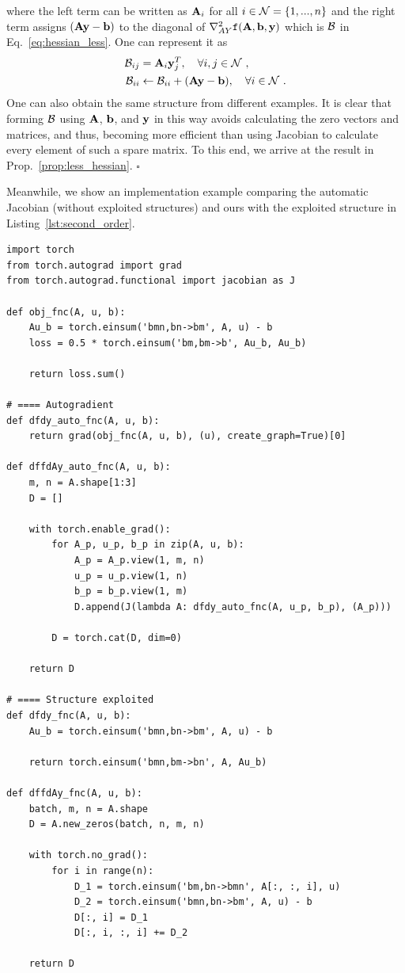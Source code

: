 where the left term can be written as $\mathbf{A}_i$ for all $i \in \mathcal{N} = \{1, ..., n\}$ and
the right term assigns $(\mathbf{A} \mathbf{y} - \mathbf{b})$ to the diagonal of $\nabla^2_{AY} \texttt{f}(\mathbf{A}, \mathbf{b}, \mathbf{y})$ which is $\mathcal{B}$ in Eq.~\eqref{eq:hessian_less}.
One can represent it as
\begin{align}
    \mathcal{B}_{ij} &= \mathbf{A}_i \mathbf{y}^T_j, \quad \forall i, j \in \mathcal{N}\ ,\\
    \mathcal{B}_{ii} &\leftarrow \mathcal{B}_{ii} + (\mathbf{A} \mathbf{y} - \mathbf{b}), \quad \forall i \in \mathcal{N}\ .
\end{align}
One can also obtain the same structure from different examples.
It is clear that forming $\mathcal{B}$ using $\mathbf{A}$, $\mathbf{b}$, and $\mathbf{y}$ in this way avoids calculating the zero vectors and matrices, and thus, becoming more efficient than using Jacobian to calculate every element of such a spare matrix.
To this end, we arrive at the result in Prop.~\ref{prop:less_hessian}. $\square$

\clearpage
Meanwhile, we show an implementation example comparing the automatic Jacobian (without exploited structures) and ours with the exploited structure in Listing~\ref{lst:second_order}.
%
\begin{lstlisting}[basicstyle=\footnotesize\ttfamily,linewidth=16cm,label={lst:second_order},caption={\textit{\normalsize \hspace{8mm}An implementation example of exploited Hessian structure for LESS.}\\}]
import torch
from torch.autograd import grad
from torch.autograd.functional import jacobian as J

def obj_fnc(A, u, b):
    Au_b = torch.einsum('bmn,bn->bm', A, u) - b
    loss = 0.5 * torch.einsum('bm,bm->b', Au_b, Au_b)

    return loss.sum()

# ==== Autogradient
def dfdy_auto_fnc(A, u, b):
    return grad(obj_fnc(A, u, b), (u), create_graph=True)[0]

def dffdAy_auto_fnc(A, u, b):
    m, n = A.shape[1:3]
    D = []

    with torch.enable_grad():
        for A_p, u_p, b_p in zip(A, u, b):
            A_p = A_p.view(1, m, n)
            u_p = u_p.view(1, n)
            b_p = b_p.view(1, m)
            D.append(J(lambda A: dfdy_auto_fnc(A, u_p, b_p), (A_p)))

        D = torch.cat(D, dim=0)

    return D

# ==== Structure exploited
def dfdy_fnc(A, u, b):
    Au_b = torch.einsum('bmn,bn->bm', A, u) - b

    return torch.einsum('bmn,bm->bn', A, Au_b)

def dffdAy_fnc(A, u, b):
    batch, m, n = A.shape
    D = A.new_zeros(batch, n, m, n)

    with torch.no_grad():
        for i in range(n):
            D_1 = torch.einsum('bm,bn->bmn', A[:, :, i], u)
            D_2 = torch.einsum('bmn,bn->bm', A, u) - b
            D[:, i] = D_1
            D[:, i, :, i] += D_2

    return D
\end{lstlisting}

